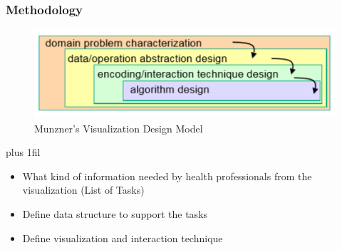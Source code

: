\documentclass{beamer}
\makeatletter
\def\normaljustify{%
  \let\\\@centercr\rightskip\z@skip \leftskip\z@skip%
  \parfillskip=0pt plus 1fil}
\makeatother
\begin{document}
\begin{frame}
\frametitle{Methodology}
\centering
\begin{figure}
\includegraphics[scale=0.7]{images/munzner_model.png}
\caption{Munzner's Visualization Design Model}
\end{figure}

\normaljustify
\begin{itemize}
\item What kind of information needed by health professionals from the visualization (List of Tasks)
\item Define data structure to support the tasks
\item Define visualization and interaction technique
\end{itemize}
\end{frame}

\end{document}
